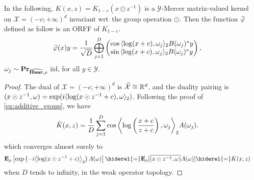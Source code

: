 \begin{example}
    In the following, $K(x,z)=K_{1-c}(x\odot z^{-1})$ is a $\mathcal{Y}$-Mercer
    matrix-valued kernel on $\mathcal{X}=(-c;+\infty)^d$ invariant
    \acs{wrt}~the group operation $\odot$. Then the function
    $\tildePhi{\omega}$ defined as follow is an \acl{ORFF} of $K_{1-c}$.
    \begin{dmath*}
        \tildePhi{\omega}(x) y=\frac{1}{\sqrt{D}}\Vect_{j=1}^D
        \begin{pmatrix}
            \cos{\inner{\log(x+c),\omega_j}_2}B(\omega_j)^\adjoint y \\
            \sin{\inner{\log(x+c),\omega_j}_2}B(\omega_j)^\adjoint y
        \end{pmatrix},
    \end{dmath*}
    $\omega_j \sim {\mathbf{{Pr}}}_{\widehat{\mathbf{Haar}},\rho}$ \ac{iid}, for all
    $y\in\mathcal{Y}$.
\end{example}
\begin{proof}
    The dual of $\mathcal{X}=(-c;+\infty)^d$ is
    $\widehat{\mathcal{X}}\cong\mathbb{R}^d$, and the duality pairing is
    $(x \odot z^{-1},\omega)=\exp(i\langle\log(x\odot z^{-1}+c),
    \omega\rangle_2)$. Following the proof of \cref{ex:additive_group}, we have
    \begin{dmath*}
        \tilde{K}(x,z)
        = \frac{1}{D} \sum_{j=1}^D
        \cos{\inner*{\log\left(\frac{x+c}{z+c}\right), \omega_j}_2}A(\omega_j).
    \end{dmath*}
    which converges almost surely to
    \begin{dmath*}
        \expectation_{\rho}\left[\exp\left(-i\inner*{\log(x\odot
        z^{-1}+c)}_2\right)A(\omega) \right] \hiderel{=}
        \expectation_{\rho}[\conj{\pairing{x\odot
        z^{-1},\omega}}A(\omega)]
        \hiderel{=} K(x, z)
    \end{dmath*}
    when $D$ tends to infinity, in the weak operator topology.
\end{proof}
